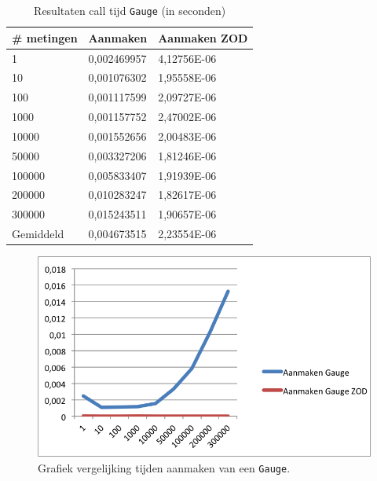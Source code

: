 \begin{table}[]
\centering
\begin{tabular}{|l|l|l|}
\hline
\# metingen & Aanmaken    & Aanmaken ZOD \\ \hline
1           & 0,002469957 & 4,12756E-06  \\ \hline
10          & 0,001076302 & 1,95558E-06  \\ \hline
100         & 0,001117599 & 2,09727E-06  \\ \hline
1000        & 0,001157752 & 2,47002E-06  \\ \hline
10000       & 0,001552656 & 2,00483E-06  \\ \hline
50000       & 0,003327206 & 1,81246E-06  \\ \hline
100000      & 0,005833407 & 1,91939E-06  \\ \hline
200000      & 0,010283247 & 1,82617E-06  \\ \hline
300000      & 0,015243511 & 1,90657E-06  \\ \hline
Gemiddeld   & 0,004673515 & 2,23554E-06  \\ \hline
\end{tabular}
\caption{Resultaten call tijd \texttt{Gauge} (in seconden)}
\label{Table:Gauge}
\end{table}

\begin{figure}[!h]
  \centering
  \includegraphics[scale=1.0]{Afbeeldingen/Evaluatie/AanmakenGauge}
  \caption{Grafiek vergelijking tijden aanmaken van een \texttt{Gauge}.}
  \label{fig:GraphGauge}
\end{figure}

